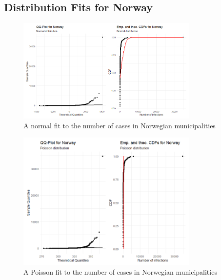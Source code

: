 \subsection{Distribution Fits for Norway}
\begin{figure}[H]
    \centering
    \includegraphics[width = 0.8\textwidth]{fit_normal_norway.png}
    \caption{A normal fit to the number of cases in Norwegian municipalities}
    \label{fitNormalNorway}
\end{figure}
\begin{figure}[H]
    \centering
    \includegraphics[width = 0.8\textwidth]{fit_poisson_norway.png}
    \caption{A Poisson fit to the number of cases in Norwegian municipalities}
    \label{fitPoissonNorway}
\end{figure}
\clearpage
